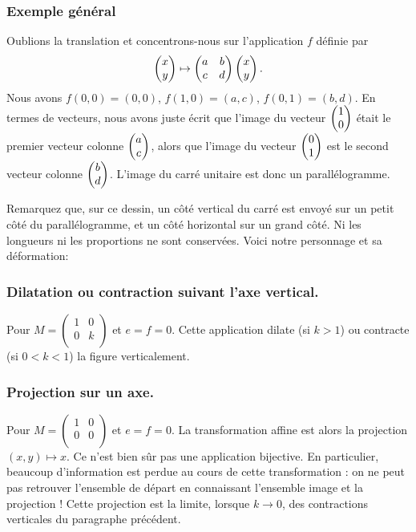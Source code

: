 \documentclass[11pt,class=report,crop=false]{standalone}
\begin{document}
\subsubsection*{Exemple général}

Oublions la translation et concentrons-nous sur l'application $f$ définie par
$$\begin{pmatrix}x \\ y\end{pmatrix} \mapsto \begin{pmatrix}a & b \\ c & d \\  \end{pmatrix}
\begin{pmatrix}x \\ y\end{pmatrix}.$$
Nous avons $f(0,0)=(0,0)$, $f(1,0) = (a,c)$, $f(0,1)=(b,d)$.
En termes de vecteurs, nous avons juste écrit que l'image du vecteur $\begin{pmatrix}1 \\ 0\end{pmatrix}$
était le premier vecteur colonne $\begin{pmatrix}a \\ c\end{pmatrix}$, alors que l'image du vecteur
$\begin{pmatrix}0 \\ 1\end{pmatrix}$ est le second vecteur colonne $\begin{pmatrix}b \\ d\end{pmatrix}$.
L'image du carré unitaire est donc un parallélogramme.


Remarquez que, sur ce dessin, un côté vertical du carré est envoyé sur
un petit côté du parallélogramme, et un côté horizontal sur un grand côté.
Ni les longueurs ni les proportions ne sont conservées.
Voici notre personnage et sa déformation:



\subsubsection*{Dilatation ou contraction suivant l'axe vertical.}
Pour $M=\left(\begin{smallmatrix} 1 & 0 \\ 0 & k \\ 
                   \end{smallmatrix} \right)$ 
et $e=f=0$. Cette application dilate (si $k > 1$) ou contracte (si $0<k<1$)
la figure verticalement.


\subsubsection*{Projection sur un axe.}

Pour $M=\left(\begin{smallmatrix} 1 & 0 \\ 0 & 0 \\ 
                   \end{smallmatrix} \right)$ 
et $e=f=0$. La transformation affine est alors la projection $(x,y) \mapsto x$.
Ce n'est bien sûr pas une application bijective. En particulier, beaucoup 
d'information est perdue au cours de cette transformation : on ne peut pas retrouver
l'ensemble de départ en connaissant l'ensemble image et la projection !
Cette projection est la limite, lorsque $k\to 0$, des contractions verticales du paragraphe précédent.
\end{document}
